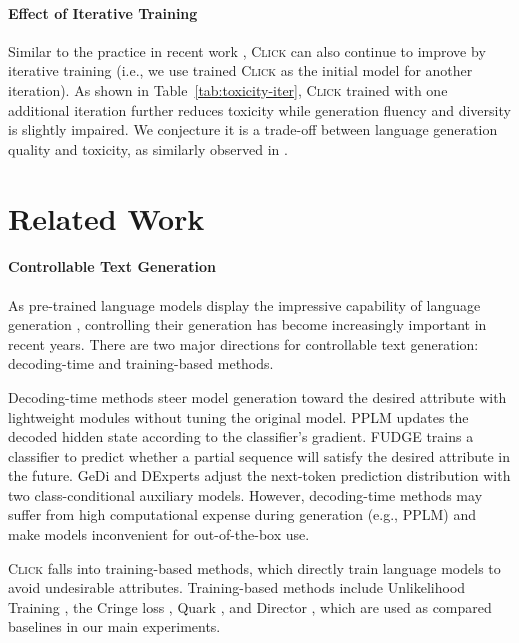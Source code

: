 \paragraph{Effect of Iterative Training} Similar to the practice in recent work \cite{quark, cringe}, \textsc{Click} can also continue to improve by iterative training (i.e., we use trained \textsc{Click} as the initial model for another iteration). As shown in Table~\ref{tab:toxicity-iter}, \textsc{Click} trained with one additional iteration further reduces toxicity while generation fluency and diversity is slightly impaired. We conjecture it is a trade-off between language generation quality and toxicity, as similarly observed in \cite{quark}.

\section{Related Work}
\label{sec:related}

\paragraph{Controllable Text Generation} As pre-trained language models display the impressive capability of language generation \cite{gpt3}, controlling their generation has become increasingly important in recent years. There are two major directions for controllable text generation: decoding-time and training-based methods.

Decoding-time methods steer model generation toward the desired attribute with lightweight modules without tuning the original model. PPLM \cite{pplm} updates the decoded hidden state according to the classifier's gradient. FUDGE \cite{fudge} trains a classifier to predict whether a partial sequence will satisfy the desired attribute in the future. GeDi \cite{gedi} and DExperts \cite{dexperts} adjust the next-token prediction distribution with two class-conditional auxiliary models. However, decoding-time methods may suffer from high computational expense during generation (e.g., PPLM) and make models inconvenient for out-of-the-box use.

\textsc{Click} falls into training-based methods, which directly train language models to avoid undesirable attributes. Training-based methods include Unlikelihood Training \cite{unlikelihood}, the Cringe loss \cite{cringe}, Quark \cite{quark}, and Director \cite{director}, which are used as compared baselines in our main experiments.

